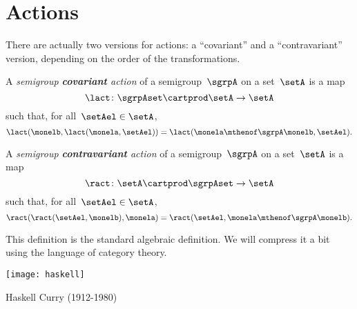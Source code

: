 
\section{Actions}
\label{sec:actions}

There are actually two versions for actions: a ``covariant'' and a ``contravariant'' version, depending on the order of the transformations.

\begin{ctdefinition}
    \label{def:semigroup-cov-action-prelim}
    A \emph{semigroup \textbf{covariant} action} of a semigroup~$\sgrpA$ on a set~$\setA$ is a map
    \begin{equation}
        \label{eq:lact}
        \lact \colon \sgrpAset \cartprod \setA \to \setA
    \end{equation}
    such that, for all~$\setAel \in \setA$,
    \begin{equation}
        \label{eq:lact1cond}
        \lact(\monelb, \lact(\monela, \setAel)) = \lact(\monela \mthenof\sgrpA \monelb, \setAel).
    \end{equation}
\end{ctdefinition}

\begin{ctdefinition}
    \label{def:semigroup-contra-action-prelim}
    A \emph{semigroup \textbf{contravariant} action} of a semigroup~$\sgrpA$ on a set~$\setA$ is a map
    \begin{equation}
        \label{eq:ract}
        \ract \colon \setA \cartprod \sgrpAset \to \setA
    \end{equation}
    such that, for all~$\setAel \in \setA$,
    \begin{equation}
        \label{eq:ract1cond}
        \ract(\ract(\setAel, \monelb), \monela) = \ract(\setAel, \monela \mthenof\sgrpA \monelb).
    \end{equation}
\end{ctdefinition}

This definition is the standard algebraic definition.
We will compress it a bit using the language of category theory.

\begin{marginfigure}
    \texttt{[image: haskell]}
    \caption{Haskell Curry (1912-1980)}
    \label{fig:haskell-curry}
\end{marginfigure}


